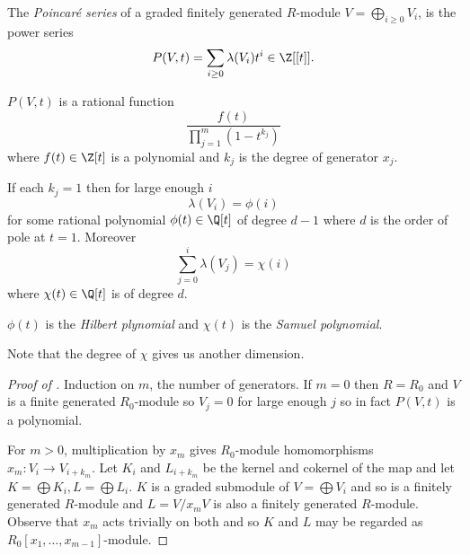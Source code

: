 \documentclass[a4paper]{article}
\begin{document}
\begin{definition}
  The \emph{Poincaré series} of a graded finitely generated \(R\)-module \(V = \bigoplus_{i \geq 0} V_i\), is the power series
  \[
    P(V, t) = \sum_{i \geq 0} \lambda(V_i) t^i \in \Z[[t]].
  \]
\end{definition}

\begin{theorem}
  \label{thm:Hilbert-Serre}
  \(P(V, t)\) is a rational function
  \[
    \frac{f(t)}{\prod_{j =1}^m (1 - t^{k_j})}
  \]
  where \(f(t) \in \Z[t]\) is a polynomial and \(k_j\) is the degree of generator \(x_j\).
\end{theorem}

\begin{corollary}
  If each \(k_j = 1\) then for large enough \(i\)
  \[
    \lambda(V_i) = \phi(i)
  \]
  for some rational polynomial \(\phi(t) \in \Q[t]\) of degree \(d - 1\) where \(d\) is the order of pole at \(t = 1\). Moreover
  \[
    \sum_{j = 0}^i \lambda(V_j) = \chi(i)
  \]
  where \(\chi(t) \in \Q[t]\) is of degree \(d\).
\end{corollary}

\begin{definition}
  \(\phi(t)\) is the \emph{Hilbert plynomial} and \(\chi(t)\) is the \emph{Samuel polynomial}.
\end{definition}

Note that the degree of \(\chi\) gives us another dimension.

\begin{proof}[Proof of ]
  Induction on \(m\), the number of generators. If \(m = 0\) then \(R = R_0\) and \(V\) is a finite generated \(R_0\)-module so \(V_j = 0\) for large enough \(j\) so in fact \(P(V, t)\) is a polynomial.

  For \(m > 0\), multiplication by \(x_m\) gives \(R_0\)-module homomorphisms \(x_m: V_i \to V_{i + k_m}\). Let \(K_i\) and \(L_{i + k_m}\) be the kernel and cokernel of the map and let \(K = \bigoplus K_i, L = \bigoplus L_i\). \(K\) is a graded submodule of \(V = \bigoplus V_i\) and so is a finitely generated \(R\)-module and \(L = V/x_mV\) is also a finitely generated \(R\)-module. Observe that \(x_m\) acts trivially on both and so \(K\) and \(L\) may be regarded as \(R_0[x_1, \dots, x_{m - 1}]\)-module.
\end{proof}

\printindex
\end{document}
